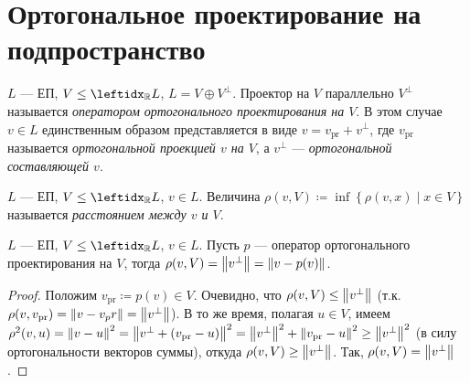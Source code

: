 \section{Ортогональное проектирование на подпространство}

\begin{defn}
    $L$ --- ЕП, $V \le \lsub{\mathbb{R}}{L}$, $L = V \oplus V^\perp$. Проектор на $V$ параллельно $V^\perp$ называется \textit{оператором ортогонального проектирования на $V$}. В этом случае $v \in L$ единственным образом представляется в виде $v = v_{\text{pr}} + v^\perp$, где $v_{\text{pr}}$ называется \textit{ортогональной проекцией $v$ на $V$}, а $v^\perp$ --- \textit{ортогональной составляющей $v$}.
\end{defn}

\begin{defn}
    $L$ --- ЕП, $V \le \lsub{\mathbb{R}}{L}$, $v \in L$. Величина $\rho(v, V) \coloneqq \inf \left\{ \rho(v, x) \mid x \in V \right\}$ называется \textit{расстоянием между $v$ и $V$}.
\end{defn}

\begin{thm*}
    $L$ --- ЕП, $V \le \lsub{\mathbb{R}}{L}$, $v \in L$. Пусть $p$ --- оператор ортогонального проектирования на $V$, тогда $\rho(v, V) = \left\lVert v^\perp\right\rVert = \left\lVert v - p(v)\right\rVert$.
\end{thm*}

\begin{proof}
    Положим $v_{\text{pr}} \coloneqq p(v) \in V$. Очевидно, что $\rho(v, V) \le \left\lVert v^\perp\right\rVert$ (т.к. $\rho(v, v_\text{pr}) = \left\lVert v - v_pr\right\rVert = \left\lVert v^\perp\right\rVert$). В то же время, полагая $u \in V$, имеем $\rho^2(v, u) = \left\lVert v - u\right\rVert^2 = \left\lVert v^\perp + (v_\text{pr} - u)\right\rVert^2 = \left\lVert v^\perp\right\rVert^2 + \left\lVert v_\text{pr} - u\right\rVert^2 \ge \left\lVert v^\perp\right\rVert^2$ (в силу ортогональности векторов суммы), откуда $\rho(v, V) \ge \left\lVert v^\perp\right\rVert$. Так, $\rho(v, V) = \left\lVert v^\perp\right\rVert$.
\end{proof}